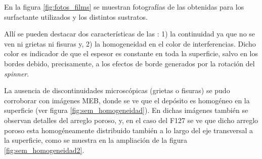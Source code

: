 	     En la figura \ref{fig:fotos_films} se muestran fotografías de las \pdm\space obtenidas para los surfactante utilizados y los distintos sustratos. 


		 Allí se pueden destacar dos características de las \pdm: 1) la continuidad ya que no se ven ni grietas ni fisuras y, 2) la homogeneidad en el color de interferencias. Dicho color es indicador de que el espesor es constante en toda la superficie, salvo en los bordes debido, precisamente, a los efectos de borde generados por la rotación del \textit{spinner}\cite{Franssila2004,Jaeger2001}.

		 La ausencia de discontinuidades microscópicas (grietas o fisuras) se pudo corroborar con imágenes MEB, donde se ve que el depósito es homogéneo en la superficie (ver figura \ref{fig:sem_homogeneidad}). En dichas imágenes también se observan detalles del arreglo poroso, y, en el caso del F127 se ve que dicho arreglo poroso esta homogéneamente distribuido también a lo largo del eje transversal a la superficie, como se muestra en la ampliación de la figura \ref{fig:sem_homogeneidad2}.
		

